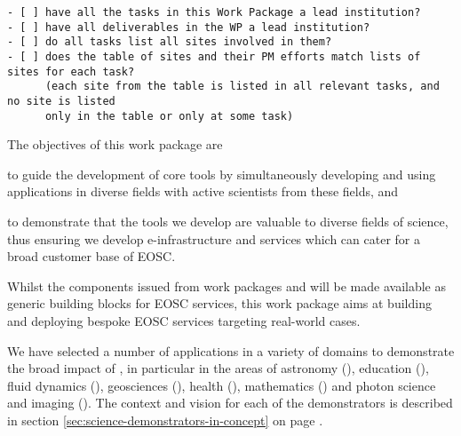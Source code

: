\begin{draft}
\begin{verbatim}
- [ ] have all the tasks in this Work Package a lead institution?
- [ ] have all deliverables in the WP a lead institution?
- [ ] do all tasks list all sites involved in them?
- [ ] does the table of sites and their PM efforts match lists of sites for each task?
      (each site from the table is listed in all relevant tasks, and no site is listed
      only in the table or only at some task)
\end{verbatim}
\end{draft}

\begin{workpackage}[id=applications,wphases=0-48,swsites,
  title=Science demonstrators,
  short=Demonstrators,
  lead=MP,
  SRLRM=9,
]
\begin{wpobjectives}
  The objectives of this work package are
 \begin{compactitem}
   \item to guide the development of core tools by simultaneously
     developing and using applications in diverse fields with active
     scientists from these fields, and
   \item to demonstrate that the tools we develop are valuable to diverse
     fields of science, thus ensuring we develop e-infrastructure and
     services which can cater for a broad customer base of EOSC.
   \end{compactitem}
\end{wpobjectives}

\begin{wpdescription}

  Whilst the components issued from work packages   and  will be
  made available as generic building blocks for EOSC services, this
  work package aims at building and deploying bespoke EOSC services
  targeting real-world cases.

  We have selected a number of applications in a variety of domains
  to demonstrate the broad impact of \TheProject, in particular in the
  areas of astronomy
  (), education
  (), fluid dynamics
  (), geosciences
  (), health
  (), mathematics
  () and photon science and imaging
  ().
  The context and vision for each of the demonstrators is described in
  section \ref{sec:science-demonstrators-in-concept} on page
  \pageref{sec:science-demonstrators-in-concept}.


\end{wpdescription}
\end{workpackage}
